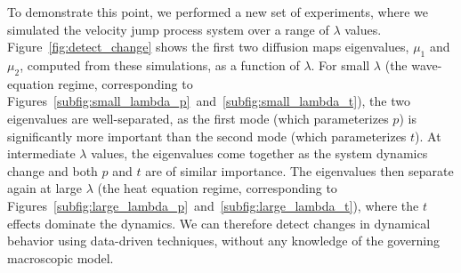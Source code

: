 \documentclass[prl, reprint]{revtex4-1}
\begin{document}
To demonstrate this point, we performed a new set of experiments, where we simulated the velocity jump process system over a range of $\lambda$ values. 
% 
Figure~\ref{fig:detect_change} shows the first two diffusion maps eigenvalues, $\mu_1$ and $\mu_2$, computed from these simulations, as a function of $\lambda$.
%
For small $\lambda$ (the wave-equation regime, corresponding to Figures~\ref{subfig:small_lambda_p}~and~\ref{subfig:small_lambda_t}), the two eigenvalues are well-separated, as the first mode (which parameterizes $p$) is significantly more important than the second mode (which parameterizes $t$).
%
At intermediate $\lambda$ values, the eigenvalues come together as the system dynamics change and both $p$ and $t$ are of similar importance.
%
The eigenvalues then separate again at large $\lambda$ (the heat equation regime, corresponding to Figures~\ref{subfig:large_lambda_p}~and~\ref{subfig:large_lambda_t}), where the $t$ effects dominate the dynamics.
%
We can therefore detect changes in dynamical behavior using data-driven techniques, without any knowledge of the governing macroscopic model. 

\end{document}
